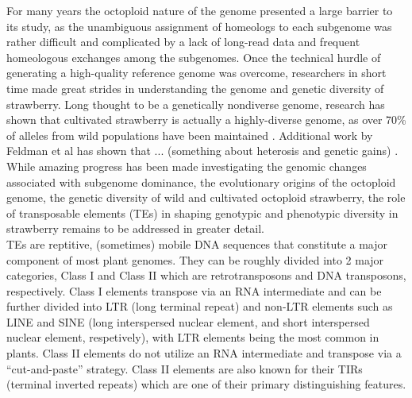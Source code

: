 \documentclass[fleqn,10pt]{olplainarticle}
\begin{document}
For many years the octoploid nature of the genome presented a large barrier to its study, as the unambiguous assignment of homeologs to each subgenome was rather difficult and complicated by a lack of long-read data and frequent homeologous exchanges among the subgenomes.
Once the technical hurdle of generating a high-quality reference genome was overcome, researchers in short time made great strides in understanding the genome and genetic diversity of strawberry.
Long thought to be a genetically nondiverse genome, research has shown that cultivated strawberry is actually a highly-diverse genome, as over 70\% of alleles from wild populations have been maintained \cite{Hardigan2020,Hardigan2021}.
Additional work by Feldman et al has shown that ... (something about heterosis and genetic gains) \cite{Feldman2024}.
While amazing progress has been made investigating the genomic changes associated with subgenome dominance, the evolutionary origins of the octoploid genome, the genetic diversity of wild and cultivated octoploid strawberry, the role of transposable elements (TEs) in shaping genotypic and phenotypic diversity in strawberry remains to be addressed in greater detail. \\

TEs are reptitive, (sometimes) mobile DNA sequences that constitute a major component of most plant genomes.
They can be roughly divided into 2 major categories, Class I and Class II which are retrotransposons and DNA transposons, respectively.
Class I elements transpose via an RNA intermediate and can be further divided into LTR (long terminal repeat) and non-LTR elements such as LINE and SINE (long interspersed nuclear element, and short interspersed nuclear element, respetively), with LTR elements being the most common in plants.
Class II elements do not utilize an RNA intermediate and transpose via a ``cut-and-paste'' strategy.
Class II elements are also known for their TIRs (terminal inverted repeats) which are one of their primary distinguishing features. \\
\end{document}
